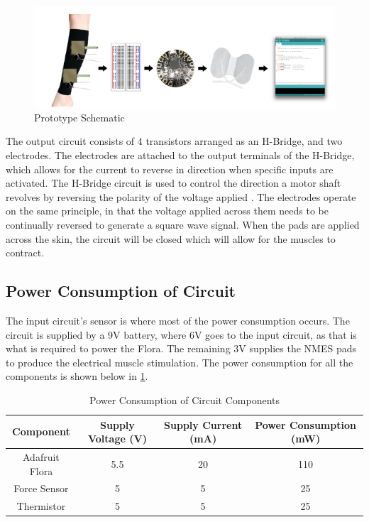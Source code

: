 \documentclass[11.5pt]{article}
\begin{document}
\begin{figure}[H]
    \centering
    \includegraphics[width=0.7\linewidth]{design/PTS.PNG}
    \caption{Prototype Schematic}
    \label{fig:PTS}
\end{figure}
\vspace{0.5}

The output circuit consists of 4 transistors arranged as an H-Bridge, and two electrodes. The electrodes are attached to the output terminals of the H-Bridge, which allows for the current to reverse in direction when specific inputs are activated. The H-Bridge circuit is used to control the direction a motor shaft revolves by reversing the polarity of the voltage applied . The electrodes operate on the same principle, in that the voltage applied across them needs to be continually reversed to generate a square wave signal. When the pads are applied across the skin, the circuit will be closed which will allow for the muscles to contract. 

\subsection{Power Consumption of Circuit}
The input circuit's sensor is where most of the power consumption occurs. The circuit is supplied by a 9V battery, where 6V goes to the input circuit, as that is what is required to power the Flora. The remaining 3V supplies the NMES pads to produce the electrical muscle stimulation. The power consumption for all the components is shown below in \ref{table:power}.

\begin{table}[!ht]
    \caption{Power Consumption of Circuit Components}
	\vspace{3mm}
	\centering
	\begin{tabular}{cccc}
	\hline
		 Component & Supply Voltage (V) & Supply Current (mA) & Power Consumption (mW)\\
	\hline
		Adafruit Flora & 5.5 & 20 & 110\\
		Force Sensor &  5 &  5 &  25\\
        Thermistor &5   & 5 &  25\\
	\hline
	\end{tabular}
	\label{table:power}
	\end{table}
\end{document}
